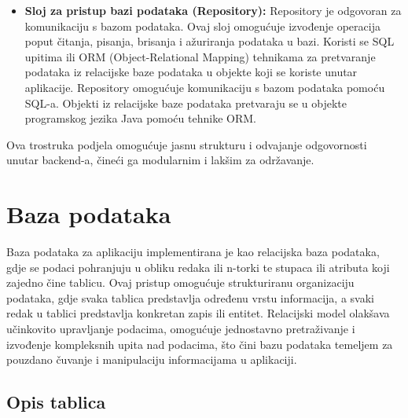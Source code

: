 {\begin{itemize}
				\item \textbf{Sloj za pristup bazi podataka (Repository):}
				Repository je odgovoran za komunikaciju s bazom podataka. Ovaj sloj omogućuje izvođenje operacija poput čitanja, pisanja, brisanja i ažuriranja podataka u bazi. Koristi se SQL upitima ili ORM (Object-Relational Mapping) tehnikama za pretvaranje podataka iz relacijske baze podataka u objekte koji se koriste unutar aplikacije. Repository omogućuje komunikaciju s bazom podataka pomoću SQL-a. Objekti iz relacijske baze podataka pretvaraju se u objekte programskog jezika Java pomoću tehnike ORM.
				
			\end{itemize}
			
			Ova trostruka podjela omogućuje jasnu strukturu i odvajanje odgovornosti unutar backend-a, čineći ga modularnim i lakšim za održavanje.
			
			
		}
		
		
		
		
		
		
		
		
		\section{Baza podataka}
		
		
		
		{
			Baza podataka za aplikaciju implementirana je kao relacijska baza podataka, gdje se podaci pohranjuju u obliku redaka ili n-torki te stupaca ili atributa koji zajedno čine tablicu. Ovaj pristup omogućuje strukturiranu organizaciju podataka, gdje svaka tablica predstavlja određenu vrstu informacija, a svaki redak u tablici predstavlja konkretan zapis ili entitet. Relacijski model olakšava učinkovito upravljanje podacima, omogućuje jednostavno pretraživanje i izvođenje kompleksnih upita nad podacima, što čini bazu podataka temeljem za pouzdano čuvanje i manipulaciju informacijama u aplikaciji.}
		
		\subsection{Opis tablica}
		
